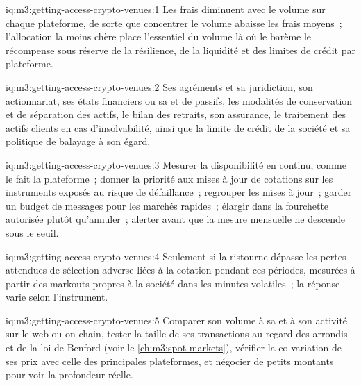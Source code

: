 \begin{solution}{iq:m3:getting-access-crypto-venues:1}
Les frais diminuent avec le volume sur chaque plateforme, de sorte que concentrer le volume abaisse les frais moyens~; l'allocation la moins chère place l'essentiel du volume là où le barème le récompense
sous réserve de la résilience, de la liquidité et des limites de crédit par plateforme.
\end{solution}

\begin{solution}{iq:m3:getting-access-crypto-venues:2}
Ses agréments et sa juridiction, son actionnariat, ses états financiers ou sa  et de passifs, les modalités de conservation et de séparation des actifs, le bilan des
retraits, son assurance, le traitement des actifs clients en cas d'insolvabilité, ainsi que la limite de crédit de la société et sa politique de balayage à son égard.
\end{solution}

\begin{solution}{iq:m3:getting-access-crypto-venues:3}
Mesurer la disponibilité en continu, comme le fait la plateforme~; donner la priorité aux mises à jour de cotations sur les instruments exposés au risque de défaillance~; regrouper les mises à jour~; garder un budget de messages
pour les marchés rapides~; élargir dans la fourchette autorisée plutôt qu'annuler~; alerter avant que la mesure mensuelle ne descende sous le seuil.
\end{solution}

\begin{solution}{iq:m3:getting-access-crypto-venues:4}
Seulement si la ristourne dépasse les pertes attendues de sélection adverse liées à la cotation pendant ces périodes, mesurées à partir des markouts propres à la société dans les
minutes volatiles~; la réponse varie selon l'instrument.
\end{solution}

\begin{solution}{iq:m3:getting-access-crypto-venues:5}
Comparer son volume à sa  et à son activité sur le web ou on-chain, tester la taille de ses transactions au regard des arrondis et de la loi de Benford
(voir le \cref{ch:m3:spot-markets}), vérifier la co-variation de ses prix avec celle des principales plateformes, et négocier de petits montants pour voir la profondeur réelle.
\end{solution}

